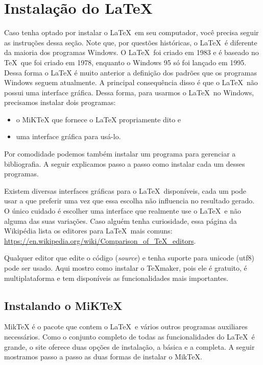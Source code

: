 \chapter{Instalação do \LaTeX}
\label{cap:instalacao}

Caso tenha optado por instalar o \LaTeX\ em seu computador, você precisa seguir as instruções dessa seção. Note que, por questões históricas, o \LaTeX\ é diferente da maioria dos programas Windows. O \LaTeX\ foi criado em 1983 e é baseado no \TeX\ que foi criado em 1978, enquanto o Windows 95 só foi lançado em 1995. Dessa forma o LaTeX é muito anterior a definição dos padrões que os programas Windows seguem atualmente. A principal consequência disso é que o \LaTeX\ não possui uma interface gráfica. Dessa forma, para usarmos o \LaTeX\ no Windows, precisamos instalar dois programas:

\begin{itemize}
    \item o MiKTeX que fornece o LaTeX propriamente dito e
\item uma interface gráfica para usá-lo.
\end{itemize}

Por comodidade podemos também instalar um programa para gerenciar a bibliografia. A seguir explicamos passo a passo como instalar cada um desses programas.

Existem diversas interfaces gráficas para o \LaTeX\ disponíveis, cada um pode usar a que preferir uma vez que essa escolha não influencia no resultado gerado. O único cuidado é escolher uma interface que realmente use o \LaTeX\ e não alguma das suas variações. Caso alguém tenha curiosidade, essa página da Wikipédia lista os editores para \LaTeX\ mais comuns: \url{https://en.wikipedia.org/wiki/Comparison\_of\_TeX\_editors}.

Qualquer editor que edite o código (\textit{source}) e tenha suporte para unicode (utf8) pode ser usado. Aqui mostro como instalar o TeXmaker, pois ele é gratuito, é multiplataforma e tem disponíveis as funcionalidades mais importantes.

\section{Instalando o MiKTeX}

MikTeX é o pacote que contem o \LaTeX\ e vários outros programas auxiliares necessários. Como o conjunto completo de todas as funcionalidades do \LaTeX\ é grande, o site oferece duas opções de instalação, a básica e a completa. A seguir mostramos passo a passo as duas formas de instalar o MikTeX.

